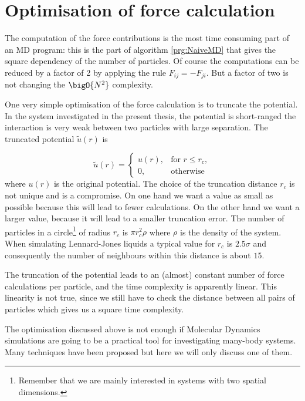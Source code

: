 \section{Optimisation of force calculation}
\label{sect:OptForceCalc}
The computation of the force contributions is the most time consuming
part of an MD program: this is the part of algorithm \ref{prg:NaiveMD} that
gives the square dependency of the number of particles. Of course the
computations can be reduced by a factor of 2 by applying the rule
$F_{ij} = -F_{ji}$. But a factor of two is not changing the
$\bigO{N^2}$ complexity.

One very simple optimisation of the force calculation is to truncate
the potential. In the system investigated in the present thesis, the
potential is short-ranged \ie the interaction is very weak between two
particles with large separation. The truncated potential $\tilde{u}(r)$
is 

\begin{equation}
  \tilde{u}(r) = 
  \begin{cases}
    u(r), & \text{for $r\le r_c$}, \\
    0,    & \text{otherwise}
  \end{cases}
\end{equation}
where $u(r)$ is the original potential. The choice of the truncation
distance $r_c$ is not unique and is a compromise. On one hand we want
a value as small as possible because this will lead to fewer
calculations. On the other hand we want a larger value, because it
will lead to a smaller truncation error. The number of particles in a
circle\footnote{Remember that we are mainly interested in systems with
  two spatial dimensions.} of radius $r_c$ is $\pi r_c^2 \rho$ where
$\rho$ is the density of the system. When simulating Lennard-Jones
liquids a typical value for $r_c$ is $2.5\sigma$ and consequently the
number of neighbours within this distance is about $15$. 

The truncation of the potential leads to an (almost) constant number of
force calculations per particle, and the time complexity is apparently
linear. This linearity is not true, since we still have to check the
distance between all pairs of particles which gives us a square time
complexity. 

The optimisation discussed above is not enough if Molecular Dynamics
simulations are going to be a practical tool for investigating
many-body systems. Many techniques have been proposed but here we will
only discuss one of them. 

